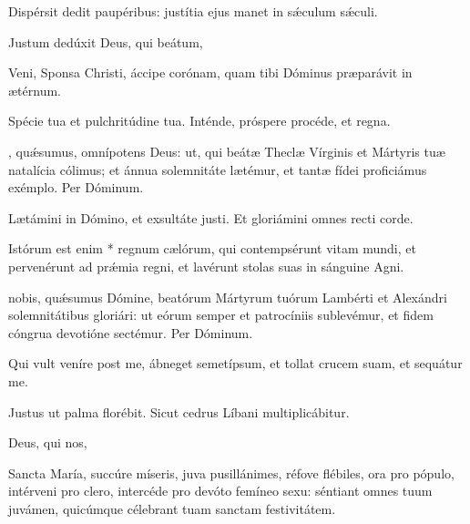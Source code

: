 \documentclass[fontsize=9pt,paper=A6,twoside,BCOR=1mm,DIV=22,headinclude]{scrarticle}
\begin{document}
\begin{multicols}{2}

\Ant Dispérsit dedit paupéribus: justítia ejus manet in sǽculum sǽculi.

\V Justum dedúxit  Deus, qui beátum, 


\Ant Veni, Sponsa Christi, áccipe corónam, quam tibi Dóminus præparávit in ætérnum.

\V Spécie tua et pulchritúdine tua.
\R Inténde, próspere procéde, et regna.

, quǽsumus, omnípotens Deus: ut, qui beátæ Theclæ Vírginis et Mártyris tuæ natalícia cólimus; et ánnua solemnitáte lætémur, et tantæ fídei proficiámus exémplo. Per Dóminum.





\V Lætámini in Dómino, et exsultáte justi.
\R Et gloriámini omnes recti corde.

\M Istórum est enim * regnum cælórum, qui contempsérunt vitam mundi, et pervenérunt ad pr\'æmia regni, et lavérunt stolas suas in sánguine Agni.

 nobis, qu\'æsumus Dómine, beatórum Mártyrum tu\-ó\-rum Lambérti et Alexándri solemnitátibus gloriári: ut eórum semper et patrocíniis sublevémur, et fidem cóngrua devotióne sectémur. Per Dóminum.


\A Qui vult veníre post me, ábneget semetípsum, et tollat crucem suam, et sequátur me.

\V Justus ut palma florébit.
\R Sicut cedrus Líbani multiplicábitur.

 Deus, qui nos, 

\A Sancta María, succúre míseris, juva pusillánimes, réfove flébiles, ora pro pópulo, intérveni pro clero, intercéde pro devóto femíneo sexu: séntiant omnes tuum juvámen, quicúmque célebrant tuam sanctam festivitátem.


\end{multicols}
\end{document}
